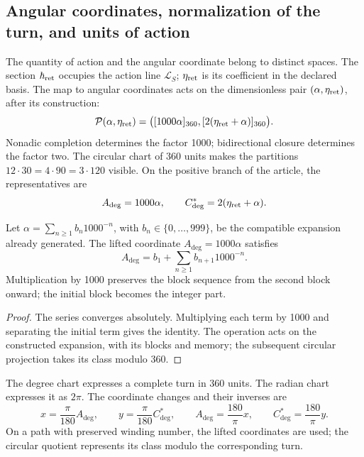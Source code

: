 \subsection{Angular coordinates, normalization of the turn, and units of action}
\label{sec:ii-angulos}

The quantity of action and the angular coordinate belong to distinct
spaces. The section \(\hbar_{\rm ret}\) occupies the action line
\(\mathcal L_S\); \(\eta_{\rm ret}\) is its coefficient in the
declared basis. The map to angular coordinates acts on the dimensionless pair
\((\alpha,\eta_{\rm ret})\), after its construction:
\begin{equation}
 \mathcal P(\alpha,\eta_{\rm ret})
 =\bigl([1000\alpha]_{360},[2(\eta_{\rm ret}+\alpha)]_{360}\bigr).
 \label{eq:ii-par-angular}
\end{equation}
Nonadic completion determines the factor 1000; bidirectional
closure determines the factor two. The circular chart of 360
units makes the partitions
\(12\cdot30=4\cdot90=3\cdot120\) visible. On the positive branch of
the article, the representatives are
\[
 A_{\deg}=1000\alpha,\qquad
 C^*_{\deg}=2(\eta_{\rm ret}+\alpha).
\]

\begin{proposition}
\label{prop:ii-desplazamiento-angular}
Let \(\alpha=\sum_{n\geq1}b_n1000^{-n}\), with
\(b_n\in\{0,\ldots,999\}\), be the compatible expansion already generated.
The lifted coordinate \(A_{\deg}=1000\alpha\) satisfies
\[
 A_{\deg}=b_1+\sum_{n\geq1}b_{n+1}1000^{-n}.
\]
Multiplication by 1000 preserves the block sequence from the second block onward;
the initial block becomes the integer part.
\end{proposition}
\begin{proof}
The series converges absolutely. Multiplying each term by 1000
and separating the initial term gives the identity. The operation
acts on the constructed expansion, with its blocks and memory;
the subsequent circular projection takes its class modulo 360.
\end{proof}

\begin{definition}
The degree chart expresses a complete turn in 360 units.
The radian chart expresses it as \(2\pi\). The coordinate changes
and their inverses are
\[
 x=\frac{\pi}{180}A_{\deg},\qquad
 y=\frac{\pi}{180}C^*_{\deg},\qquad
 A_{\deg}=\frac{180}{\pi}x,\qquad
 C^*_{\deg}=\frac{180}{\pi}y.
\]
On a path with preserved winding number, the lifted coordinates
are used; the circular quotient represents its class modulo
the corresponding turn.
\end{definition}

